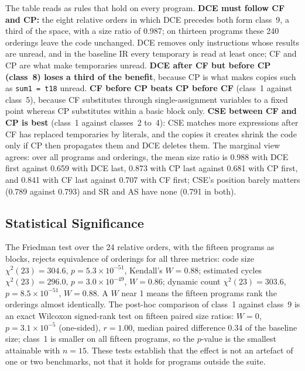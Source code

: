 \documentclass[conference]{IEEEtran}
\begin{document}
The table reads as rules that hold on every program. \textbf{DCE must follow CF and CP:} the eight relative orders in which DCE precedes both form class~9, a third of the space, with a size ratio of 0.987; on thirteen programs these 240 orderings leave the code unchanged. DCE removes only instructions whose results are unread, and in the baseline IR every temporary is read at least once; CF and CP are what make temporaries unread. \textbf{DCE after CF but before CP (class~8) loses a third of the benefit}, because CP is what makes copies such as \texttt{sum1 = t18} unread. \textbf{CF before CP beats CP before CF} (class~1 against class~5), because CF substitutes through single-assignment variables to a fixed point whereas CP substitutes within a basic block only. \textbf{CSE between CF and CP is best} (class~1 against classes~2 to~4): CSE matches more expressions after CF has replaced temporaries by literals, and the copies it creates shrink the code only if CP then propagates them and DCE deletes them. The marginal view agrees: over all programs and orderings, the mean size ratio is 0.988 with DCE first against 0.659 with DCE last, 0.873 with CP last against 0.681 with CP first, and 0.841 with CF last against 0.707 with CF first; CSE's position barely matters (0.789 against 0.793) and SR and AS have none (0.791 in both).

\subsection{Statistical Significance}
\label{sec:stats}
The Friedman test over the 24 relative orders, with the fifteen programs as blocks, rejects equivalence of orderings for all three metrics: code size $\chi^2(23) = 304.6$, $p = 5.3 \times 10^{-51}$, Kendall's $W = 0.88$; estimated cycles $\chi^2(23) = 296.0$, $p = 3.0 \times 10^{-49}$, $W = 0.86$; dynamic count $\chi^2(23) = 303.6$, $p = 8.5 \times 10^{-51}$, $W = 0.88$. A $W$ near 1 means the fifteen programs rank the orderings almost identically. The post-hoc comparison of class~1 against class~9 is an exact Wilcoxon signed-rank test on fifteen paired size ratios: $W = 0$, $p = 3.1 \times 10^{-5}$ (one-sided), $r = 1.00$, median paired difference 0.34 of the baseline size; class~1 is smaller on all fifteen programs, so the $p$-value is the smallest attainable with $n = 15$. These tests establish that the effect is not an artefact of one or two benchmarks, not that it holds for programs outside the suite.
\end{document}
